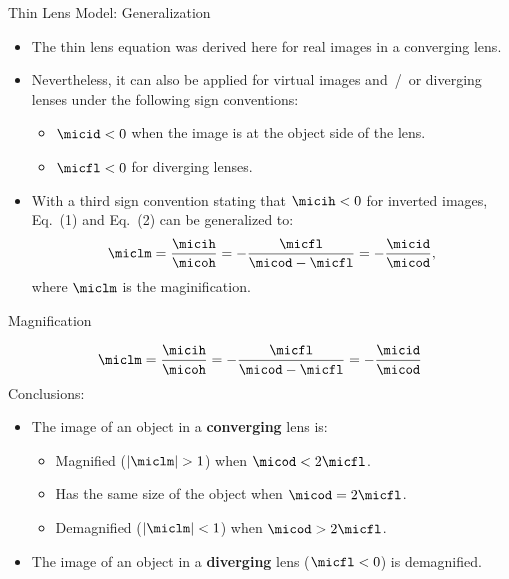 \begin{frame}[c]{Thin Lens Model: Generalization}
	\begin{itemize}
		\setlength\itemsep{.4cm}
		\item<1-> The thin lens equation was derived here for real images in a converging lens.
		\item<2-> Nevertheless, it can also be applied for virtual images and~/~or diverging lenses under the following sign conventions:
		      \begin{itemize}
			      \item<3-> $\micid < 0$ when the image is at the object side of the lens.
			      \item<4-> $\micfl < 0$ for diverging lenses.
		      \end{itemize}
		\item<5-> With a third sign convention stating that $\micih < 0$ for inverted images, Eq.~(1) and Eq.~(2) can be generalized to:
		      \begin{equation}\label{eq:mic:mag}
			      {\miclm} = \frac{\micih}{\micoh} = - \frac{\micfl}{\micod-\micfl} = - \frac{\micid}{\micod},
		      \end{equation}
		      where $\miclm$ is the maginification.
	\end{itemize}
\end{frame}
\begin{frame}[c]{Magnification}

	 {\[{\miclm} = \frac{\micih}{\micoh} = - \frac{\micfl}{\micod-\micfl} = - \frac{\micid}{\micod}\]}
	\vspace{0.4cm}
	\uncover<2-> {Conclusions:}
	\begin{itemize}
		\setlength\itemsep{0.4cm}
		\item<3-> The image of an object in a \textbf{converging} lens is:
		      \begin{itemize}
			      \item<4-> Magnified ($\left|\miclm\right| > 1$) when $\micod < 2 \micfl$.
			      \item<5-> Has the same size of the object when $\micod = 2 \micfl$.
			      \item<6-> Demagnified ($\left|\miclm\right| < 1$) when $\micod > 2 \micfl$.
		      \end{itemize}
		\item<7-> The image of an object in a \textbf{diverging} lens ($\micfl < 0$) is demagnified.
	\end{itemize}

\end{frame}
